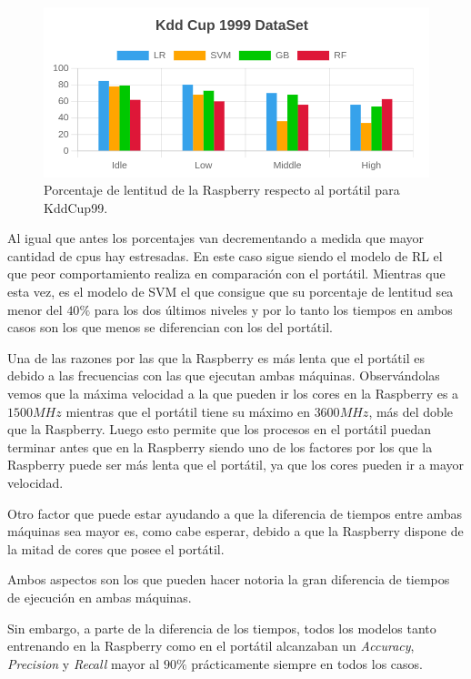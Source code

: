 \documentclass[a4paper, 12pt]{book}
\begin{document}
\begin{figure}[]
  \centering
  \includegraphics[width=14cm, keepaspectratio]{img/per_kdd.png}
  \caption{Porcentaje de lentitud de la Raspberry respecto al portátil para KddCup99.}
  \label{fig:per_kdd}
\end{figure}

Al igual que antes los porcentajes van decrementando a medida que mayor cantidad de cpus hay estresadas. En este caso sigue siendo el modelo de RL el que peor comportamiento realiza en comparación con el portátil. Mientras que esta vez, es el modelo de SVM el que consigue que su porcentaje de lentitud sea menor del $40\%$ para los dos últimos niveles y por lo tanto los tiempos en ambos casos son los que menos se diferencian con los del portátil.

Una de las razones por las que la Raspberry es más lenta que el portátil es debido a las frecuencias con las que ejecutan ambas máquinas. Observándolas vemos que la máxima velocidad a la que pueden ir los cores en la Raspberry es a $1500MHz$ mientras que el portátil tiene su máximo en $3600MHz$, más del doble que la Raspberry. Luego esto permite que los procesos en el portátil puedan terminar antes que en la Raspberry siendo uno de los factores por los que la Raspberry puede ser más lenta que el portátil, ya que los cores pueden ir a mayor velocidad.

Otro factor que puede estar ayudando a que la diferencia de tiempos entre ambas máquinas sea mayor es, como cabe esperar, debido a que la Raspberry dispone de la mitad de cores que posee el portátil.

Ambos aspectos son los que pueden hacer notoria la gran diferencia de tiempos de ejecución en ambas máquinas.

Sin embargo, a parte de la diferencia de los tiempos, todos los modelos tanto entrenando en la Raspberry como en el portátil alcanzaban un \textit{Accuracy}, \textit{Precision} y \textit{Recall} mayor al $90\%$ prácticamente siempre en todos los casos.
\end{document}
